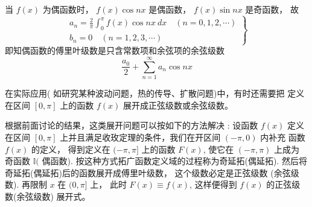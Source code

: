 \begin{definition}[余弦级数]
    当 $ f(x) $ 为偶函数时， $ f(x) \cos n x $ 是偶函数， $ f(x) \sin n x $ 是奇函数， 故
\begin{equation}
\left.\begin{array}{l}
a_{n}=\frac{2}{\pi} \int_{0}^{\pi} f(x) \cos n x {~d} x \quad(n=0,1,2, \cdots) \\
b_{n}=0 \quad(n=1,2,3, \cdots)
\end{array}\right\}
\end{equation}
即知偶函数的傅里叶级数是只含常数项和余弦项的余弦级数
\begin{equation}
\frac{a_{0}}{2}+\sum_{n=1}^{\infty} a_{n} \cos n x
\end{equation}
\end{definition}

在实际应用( 如研究某种波动问题，热的传导、扩散问题)中，有时还需要把 定义在区间 $ [0, \pi] $ 上的函数 $ f(x) $ 展开成正弦级数或余弦级数。

根据前面讨论的结果，这类展开问题可以按如下的方法解决 : 设函数 $ f(x) $ 定义在区间 $ [0, \pi] $ 上并且满足收玫定理的条件，我们在开区间 $ (-\pi, 0) $ 内补充 函数 $ f(x) $ 的定义， 得到定义在 $ (-\pi, \pi] $ 上的函数 $ F(x) $, 使它在 $ (-\pi, \pi) $ 上成为 奇函数 $ \mathbb{I}( $ 偶函数). 按这种方式拓广函数定义域的过程称为奇延拓(偶延拓). 然后将奇延拓(偶延拓)后的函数展开成傅里叶级数， 这个级数必定是正弦级数 (余弦级数). 再限制 $ x $ 在 $ (0, \pi] $ 上， 此时 $ F(x) \equiv f(x) $, 这样便得到 $ f(x) $ 的正弦级 数(余弦级数) 展开式。


